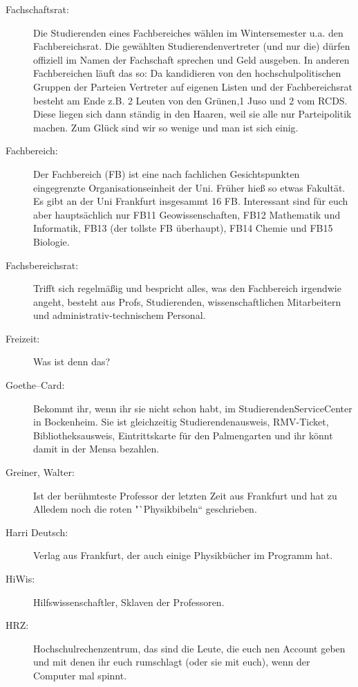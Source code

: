 \begin{description}
    \item[Fachschaftsrat:]Die Studierenden eines Fachbereiches wählen im
Wintersemester u.a. den Fachbereichsrat. Die gewählten
Studierendenvertreter (und nur die) dürfen offiziell im Namen der
Fachschaft sprechen und Geld ausgeben. In anderen Fachbereichen
läuft das so: Da kandidieren von den hochschulpolitischen
Gruppen der Parteien Vertreter auf eigenen Listen und der
Fachbereichsrat besteht am Ende z.B. 2 Leuten von den Grünen,1
Juso und 2 vom RCDS. Diese liegen sich dann ständig in den Haaren,
weil sie alle nur Parteipolitik machen. Zum Glück sind wir so
wenige und man ist sich einig.

    \item[Fachbereich:]Der Fachbereich (FB)
ist eine nach fachlichen Gesichtspunkten eingegrenzte
Organisationseinheit der Uni. Früher hieß so etwas Fakultät. Es
gibt an der Uni Frankfurt insgesammt 16 FB. Interessant sind für
euch aber hauptsächlich nur FB11 Geowissenschaften, FB12
Mathematik und Informatik, FB13 (der tollste FB überhaupt), FB14
Chemie und FB15 Biologie.

    \item[Fachsbereichsrat:]Trifft sich regelmäßig und bespricht
alles, was den Fachbereich irgendwie angeht, besteht aus Profs,
Studierenden, wissenschaftlichen Mitarbeitern und
administrativ-technischem Personal.

    \item[Freizeit:] Was ist denn das?

\item[Goethe--Card:] Bekommt ihr, wenn ihr sie nicht schon habt, im StudierendenServiceCenter in Bockenheim.
Sie ist gleichzeitig Studierendenausweis, RMV-Ticket, Bibliotheksausweis, Eintrittskarte für den Palmengarten und ihr könnt damit in der Mensa bezahlen.

\item[Greiner, Walter:]
Ist der berühmteste Professor der letzten Zeit aus Frankfurt und
hat zu Alledem noch die roten "`Physikbibeln`` geschrieben.

    \item[Harri Deutsch:] Verlag aus Frankfurt, der auch einige Physikb\"ucher im Programm hat.

    \item[HiWis:] Hilfswissenschaftler, Sklaven der Professoren.

    \item[HRZ:]Hochschulrechenzentrum, das sind die Leute, die euch nen Account
geben und mit denen ihr euch rumschlagt (oder sie mit euch), wenn
der Computer mal spinnt.


\end{description}
